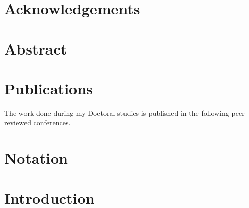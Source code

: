 \documentclass[12pt,a4paper,twoside,openright]{book}
\begin{document}
\pagestyle{empty}


\frontmatter
\pagestyle{plain}


%
% 
\chapter*{Acknowledgements}

% 
\chapter{Abstract} 
% 
%
\chapter{Publications}
The work done during my Doctoral studies is published in the following peer reviewed conferences.



\cleardoublepage
{}
\tableofcontents
\listofalgorithms

\chapter*{Notation} 

\mainmatter 
\pagestyle{fancy}

\chapter{Introduction} \label{ch:intro} 
%
% 
\end{document}
